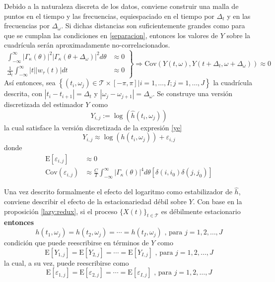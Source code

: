 \documentclass[12pt,letterpaper]{book}
\newcommand{\intR}{\int_{-\infty}^{\infty}}
\newcommand{\E}[1]{\mathrm{E}\left[ #1 \right]}
\newcommand{\Cov}[1]{\mathrm{Cov}\left( #1 \right)}
\newcommand{\abso}[1]{\left| #1 \right|}
\newcommand{\xt}{$\{X(t)\}_{t\in \mathcal{T}}$ }
\begin{document}
Debido a la naturaleza discreta de los datos, conviene construir una malla de puntos en el tiempo y las frecuencias, equiespaciado en el tiempo por $\Delta_t$ y en las frecuencias por $\Delta_\omega$.
%
Si dichas distancias son suficientemente grandes como para que se cumplan las condiciones en \ref{separacion}, entonces los valores de $Y$ sobre la cuadrícula serán aproximadamente no-correlacionados.
%
\begin{equation}
\left.
\begin{aligned}
\intR \abso{\Gamma_\kappa(\theta)}^{2}\abso{\Gamma_\kappa(\theta+\Delta_\omega)}^{2} d\theta 
&\approx 0 \\
\frac{1}{\Delta_t} \intR \abso{t} \abso{w_\tau (t)} dt &\approx 0
\end{aligned}
\right\rbrace
\Rightarrow
\Cov{Y(t,\omega),Y(t+\Delta_t,\omega+\Delta_\omega)} \approx 0
\label{separacion}
\end{equation}
%
Así entonces, sea
$\left\{ (t_i,\omega_j) \in \mathcal{T} \times [-\pi,\pi] | i = 1,\dots,I ; j=1,\dots,J \right\}$
la cuadrícula descrita, con $\abso{t_i - t_{i+1}}= \Delta_t$ y 
$\abso{\omega_j-\omega_{j+1}}= \Delta_\omega$. 
%
Se construye una versión discretizada del estimador $Y$ como
\begin{equation}
Y_{i,j} := \log\left(\widehat{h}(t_i,\omega_j)\right)
\end{equation}
%
la cual satisface la versión discretizada de la expresión \ref{ye} 
\begin{equation}
Y_{i,j} \approx \log\left(h(t_i,\omega_j)\right) + \varepsilon_{i,j}
\label{def:ye}
\end{equation}
donde
\begin{align}
\E{\varepsilon_{i,j}} &\approx 0 \\
\Cov{\varepsilon_{i,j}} &\approx
\frac{C}{T} \intR \abso{\Gamma_\kappa(\theta)}^{4} d\theta \left[ \delta(i,i_0)\delta(j,j_0) \right]
\end{align}

Una vez descrito formalmente el efecto del logaritmo como estabilizador de $\widehat{h}$, conviene describir el efecto de la estacionariedad débil sobre $Y$.
%
Con base en la proposición \ref{lazy:redux}, si el proceso \xt es débilmente estacionario \textbf{entonces}
%
\begin{equation}
h(t_1,\omega_j) = h(t_2,\omega_j) = \cdots = h(t_I,\omega_j) \text{ , para } j = 1, 2, \dots , J
\label{h1}
\end{equation}
condición que puede reescribirse en términos de $Y$ como
%
\begin{equation}
\E{Y_{1,j}} = \E{Y_{2,j}} = \cdots = \E{Y_{I,j}} \text{ , para } j = 1, 2, \dots , J
\label{h2}
\end{equation}
%
la cual, a su vez, puede reescribirse como
\begin{equation}
\E{\varepsilon_{1,j}} = \E{\varepsilon_{2,j}} = \cdots = \E{\varepsilon_{I,j}} \text{ , para } j = 1, 2, \dots , J
\label{h3}
\end{equation}
\end{document}
